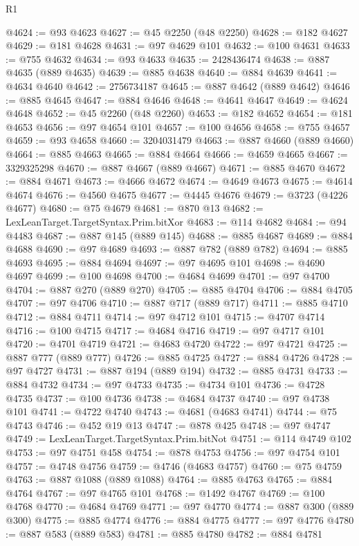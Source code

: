 \begin{lexlean}{R1}
\begin{coremodule}
@4624 := @93 @4623
@4627 := @45 @2250 (@48 @2250)
@4628 := @182 @4627
@4629 := @181 @4628
@4631 := @97 @4629 @101
@4632 := @100 @4631
@4633 := @755 @4632
@4634 := @93 @4633
@4635 := 2428436474
@4638 := @887 @4635 (@889 @4635)
@4639 := @885 @4638
@4640 := @884 @4639
@4641 := @4634 @4640
@4642 := 2756734187
@4645 := @887 @4642 (@889 @4642)
@4646 := @885 @4645
@4647 := @884 @4646
@4648 := @4641 @4647
@4649 := @4624 @4648
@4652 := @45 @2260 (@48 @2260)
@4653 := @182 @4652
@4654 := @181 @4653
@4656 := @97 @4654 @101
@4657 := @100 @4656
@4658 := @755 @4657
@4659 := @93 @4658
@4660 := 3204031479
@4663 := @887 @4660 (@889 @4660)
@4664 := @885 @4663
@4665 := @884 @4664
@4666 := @4659 @4665
@4667 := 3329325298
@4670 := @887 @4667 (@889 @4667)
@4671 := @885 @4670
@4672 := @884 @4671
@4673 := @4666 @4672
@4674 := @4649 @4673
@4675 := @4614 @4674
@4676 := @4560 @4675
@4677 := @4445 @4676
@4679 := @3723 (@4226 @4677)
@4680 := @75 @4679
@4681 := @870 @13
@4682 := LexLeanTarget.TargetSyntax.Prim.bitXor
@4683 := @114 @4682
@4684 := @94 @4483
@4687 := @887 @145 (@889 @145)
@4688 := @885 @4687
@4689 := @884 @4688
@4690 := @97 @4689
@4693 := @887 @782 (@889 @782)
@4694 := @885 @4693
@4695 := @884 @4694
@4697 := @97 @4695 @101
@4698 := @4690 @4697
@4699 := @100 @4698
@4700 := @4684 @4699
@4701 := @97 @4700
@4704 := @887 @270 (@889 @270)
@4705 := @885 @4704
@4706 := @884 @4705
@4707 := @97 @4706
@4710 := @887 @717 (@889 @717)
@4711 := @885 @4710
@4712 := @884 @4711
@4714 := @97 @4712 @101
@4715 := @4707 @4714
@4716 := @100 @4715
@4717 := @4684 @4716
@4719 := @97 @4717 @101
@4720 := @4701 @4719
@4721 := @4683 @4720
@4722 := @97 @4721
@4725 := @887 @777 (@889 @777)
@4726 := @885 @4725
@4727 := @884 @4726
@4728 := @97 @4727
@4731 := @887 @194 (@889 @194)
@4732 := @885 @4731
@4733 := @884 @4732
@4734 := @97 @4733
@4735 := @4734 @101
@4736 := @4728 @4735
@4737 := @100 @4736
@4738 := @4684 @4737
@4740 := @97 @4738 @101
@4741 := @4722 @4740
@4743 := @4681 (@4683 @4741)
@4744 := @75 @4743
@4746 := @452 @19 @13
@4747 := @878 @425
@4748 := @97 @4747
@4749 := LexLeanTarget.TargetSyntax.Prim.bitNot
@4751 := @114 @4749 @102
@4753 := @97 @4751 @458
@4754 := @878 @4753
@4756 := @97 @4754 @101
@4757 := @4748 @4756
@4759 := @4746 (@4683 @4757)
@4760 := @75 @4759
@4763 := @887 @1088 (@889 @1088)
@4764 := @885 @4763
@4765 := @884 @4764
@4767 := @97 @4765 @101
@4768 := @1492 @4767
@4769 := @100 @4768
@4770 := @4684 @4769
@4771 := @97 @4770
@4774 := @887 @300 (@889 @300)
@4775 := @885 @4774
@4776 := @884 @4775
@4777 := @97 @4776
@4780 := @887 @583 (@889 @583)
@4781 := @885 @4780
@4782 := @884 @4781

\end{coremodule}
\end{lexlean}
